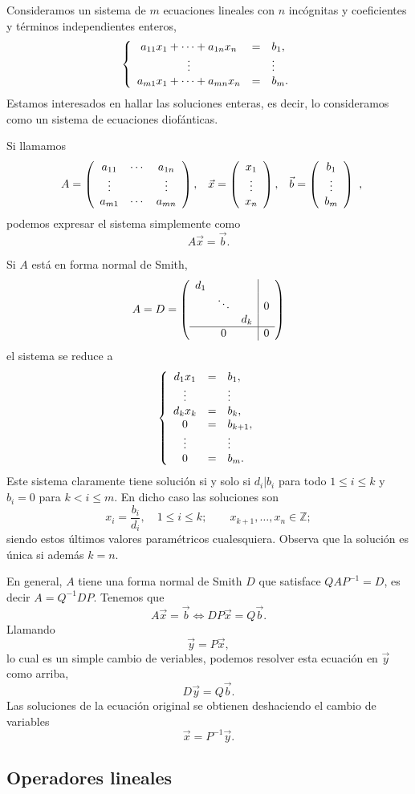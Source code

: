 Consideramos un sistema de \(m\) ecuaciones lineales con \(n\)
incógnitas y coeficientes y términos independientes enteros, \[\left\{
\begin{array}{ccl}
a_{11}x_1+\cdots+a_{1n}x_n&=&b_1,\cr \vdots&&\vdots \cr
a_{m1}x_1+\cdots+a_{mn}x_n&=&b_m.
\end{array}
\right.\] Estamos interesados en hallar las soluciones enteras, es
decir, lo consideramos como un sistema de ecuaciones diofánticas.

Si llamamos \[\begin{array}{ccc}A=
\left(\begin{array}{ccc}a_{11}&\cdots&a_{1n}\cr\vdots&&\vdots\cr a_{m1}&\cdots&a_{mn}\end{array}\right)
,&\vec{x}=\left(\begin{array}{c}x_1\cr\vdots\cr x_n\end{array}\right),
&\vec{b}=\left(\begin{array}{c}b_1\cr\vdots\cr b_m\end{array}\right)\end{array},\]
podemos expresar el sistema simplemente como \[A\vec{x}=\vec{b}.\]

Si \(A\) está en forma normal de Smith,
\[A=D=\left( \begin{array}{ccc|c} d_1&&&\cr &\ddots&&0\cr &&d_k&\cr \hline &0&&0 \end{array} \right)\]
el sistema se reduce a \[\left\{
\begin{array}{ccl}
d_1x_1&=&b_1,\cr 
\vdots&&\vdots \cr
d_kx_k&=&b_k,\cr
0&=&b_{k+1},\cr 
\vdots&&\vdots \cr
0&=&b_{m}.
\end{array}
\right.\] Este sistema claramente tiene solución si y solo si
\(d_i|b_i\) para todo \(1\leq i\leq k\) y \(b_i=0\) para
\(k{<}i\leq m\). En dicho caso las soluciones son
\[x_i=\frac{b_i}{d_i},\quad 1\leq i\leq k;\qquad x_{k+1},\dots,x_n\in\mathbb Z;\]
siendo estos últimos valores paramétricos cualesquiera. Observa que la
solución es única si además \(k=n\).

En general, \(A\) tiene una forma normal de Smith \(D\) que satisface
\(QAP^{-1}=D\), es decir \(A=Q^{-1}DP\). Tenemos que
\[A\vec{x}=\vec{b}\Leftrightarrow DP\vec{x}=Q\vec{b}.\] Llamando
\[\vec{y}=P\vec{x},\] lo cual es un simple cambio de veriables, podemos
resolver esta ecuación en \(\vec{y}\) como arriba,
\[D\vec{y}=Q\vec{b}.\] Las soluciones de la ecuación original se
obtienen deshaciendo el cambio de variables \[\vec{x}=P^{-1}\vec{y}.\]

\hypertarget{operadores-lineales}{%
\subsection{Operadores lineales}\label{operadores-lineales}}

